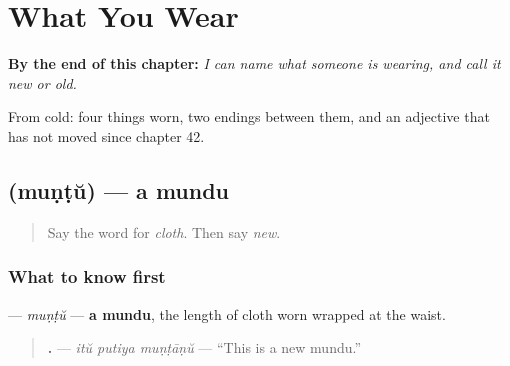 
\chapter{What You Wear}
\label{ch:ml-clothing}

\begin{chapteropening}
\textbf{By the end of this chapter:} \emph{I can name what someone is wearing, and call it new or old.}

From cold: four things worn, two endings between them, and an adjective that has not moved since chapter 42.
\end{chapteropening}

\section[\texorpdfstring{\ml{മുണ്ട്} (muṇṭŭ)}{മുണ്ട് (muṇṭŭ)}]{ (muṇṭŭ) — a mundu}

\label{lesson:ML-C100-mundu}



\begin{quote}
Say the word for \emph{cloth}. Then say \emph{new}.
\end{quote}

\subsection*{What to know first}
\textbf{} — \emph{muṇṭŭ} — \textbf{a mundu}, the length of cloth worn wrapped at the waist.

\begin{quote}
\textbf{  .} — \emph{itŭ putiya muṇṭāṇŭ} — \textquotedblleft{}This is a new mundu.\textquotedblright{}
\end{quote}

